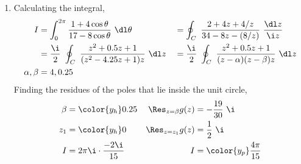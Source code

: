 \begin{enumerate}
    \item Calculating the integral,
          \begin{align}
              I             & = \int_{0}^{2\pi} \frac{1 + 4\cos \theta}
              {17 - 8\cos\theta} \ \dl \theta
                            &
                            & = \oint_C\ \frac{2 + 4z + 4/z}{34 - 8z - (8/z)}
              \ \frac{\dl z}{\i z}                                            \\
                            & = \frac{\i}{2}\ \oint_C\ \frac{z^2 + 0.5z + 1}
              {(z^2 - 4.25z + 1)z}
              \ \dl z       &
                            & = \frac{\i}{2}\ \oint_C\ \frac{z^2 + 0.5z + 1}
              {(z - \alpha)(z - \beta)z} \ \dl z                              \\
              \alpha, \beta & = 4, 0.25
          \end{align}
          Finding the residues of the poles that lie inside the unit circle,
          \begin{align}
              \beta                 & = \color{y_h} 0.25             &
              \Res_{z = \beta} g(z) & =  -\frac{19}{30}\ \i            \\
              z_1                   & = \color{y_h} 0                &
              \Res_{z = z_1} g(z)   & = \frac{1}{2}\ \i                \\
              I                     & = 2\pi\i \cdot \frac{-2\i}{15} &
              I                     & = \color{y_p} \frac{4\pi}{15}
          \end{align}


\end{enumerate}
